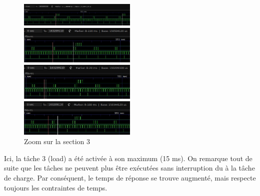\documentclass[11pt, a4paper]{article}
\begin{document}
\begin{figure}[H]
    \begin{multicols}{2}
        \begin{center}
            \includegraphics[width=0.5\textwidth]{section3_load_t1_light}
        \end{center}
        \columnbreak
        \begin{center}
            \includegraphics[width=0.5\textwidth]{section3_load_t2_cmd}
        \end{center}
    \end{multicols}
    \begin{multicols}{2}
        \begin{center}
            \includegraphics[width=0.5\textwidth]{section3_load_t3_load}
        \end{center}
        \columnbreak
        \begin{center}
            \includegraphics[width=0.5\textwidth]{section3_load_t4_leds}
        \end{center}
    \end{multicols}
    \caption{Zoom sur la section 3}
    \label{Zoom sur la section 3}
\end{figure}

Ici, la tâche 3 (load) a été activée à son maximum (15 ms).
On remarque tout de suite que les tâches ne peuvent plus être exécutées sans interruption du à la tâche de charge.
Par conséquent, le temps de réponse se trouve augmenté, mais respecte toujours les contraintes de temps.
\end{document}
